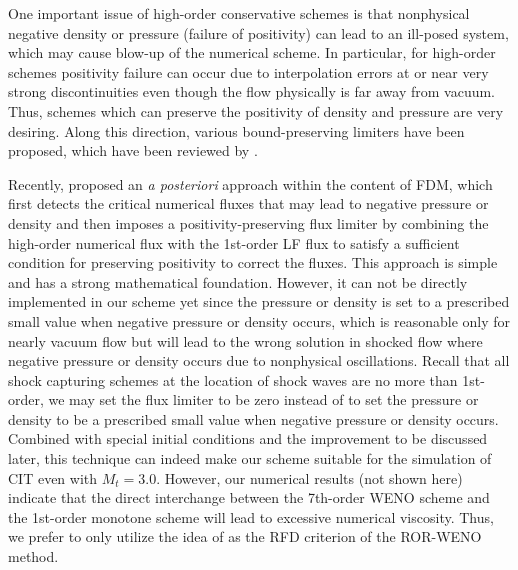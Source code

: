 \documentclass[review]{elsarticle}
\begin{document}
One important issue of high-order conservative schemes is that nonphysical negative density or pressure (failure of positivity) can lead to an ill-posed system, which may cause blow-up of the numerical scheme. In particular, for high-order schemes positivity failure can occur due to interpolation errors at or near very strong discontinuities even though the flow physically is far away from vacuum. Thus, schemes which can preserve the positivity of density and pressure are very desiring. Along this direction, various bound-preserving limiters have been proposed, which have been reviewed by \citet{Shu2016}.

Recently, \citet{Hu2013} proposed an \textit{a posteriori} approach within the content of FDM, which first detects the critical numerical fluxes that may lead to negative pressure or density and then imposes a positivity-preserving flux limiter by combining the high-order numerical flux with the 1st-order LF flux to satisfy a sufficient condition for preserving positivity to correct the fluxes. This approach is simple and has a strong mathematical foundation. However, it can not be directly implemented in our scheme yet since the pressure or density is set to a prescribed small value when negative pressure or density occurs, which is reasonable only for nearly vacuum flow but will lead to the wrong solution in shocked flow where negative pressure or density occurs due to nonphysical oscillations. Recall that all shock capturing schemes at the location of shock waves are no more than 1st-order, we may set the flux limiter to be zero instead of to set the pressure or density to be a prescribed small value when negative pressure or density occurs. Combined with special initial conditions and the improvement to be discussed later, this technique can indeed make our scheme suitable for the simulation of CIT even with $M_t = 3.0$. However, our numerical results (not shown here) indicate that the direct interchange between the 7th-order WENO scheme and the 1st-order monotone scheme will lead to excessive numerical viscosity. Thus, we prefer to only utilize the idea of \citet{Hu2013} as the RFD criterion of the ROR-WENO method.
\end{document}
